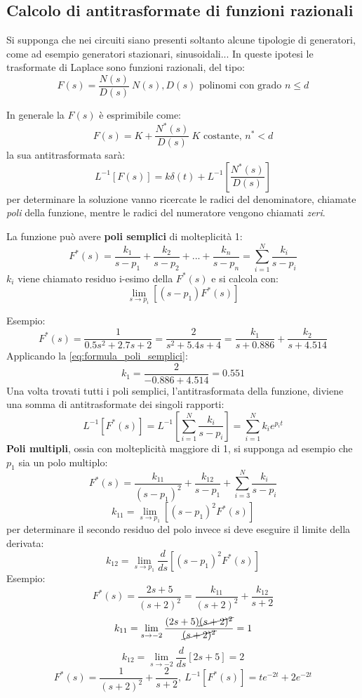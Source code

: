 
\subsection{Calcolo di antitrasformate di funzioni razionali}
Si supponga che nei circuiti siano presenti soltanto alcune tipologie di generatori, come ad esempio
generatori stazionari, sinusoidali... In queste ipotesi le trasformate di Laplace sono funzioni 
razionali, del tipo:
$$
F(s) = \frac{N(s)}{D(s)}\ N(s),D(s) \text{ polinomi con grado } n\leq d
$$

In generale la $F(s)$ è esprimibile come:
$$
F(s) = K + \frac{N^*(s)}{D(s)}\ K \text{ costante, } n^* < d
$$
la sua antitrasformata sarà:
$$
L^{-1}[F(s)] = k\delta(t) + L^{-1}\left[\frac{N^*(s)}{D(s)}\right] 
$$
per determinare la soluzione vanno ricercate le radici del denominatore, chiamate \textit{poli}
della funzione, mentre le radici del numeratore vengono chiamati \textit{zeri}.

La funzione può avere \textbf{poli semplici} di molteplicità 1:
$$
F^*(s) = \frac{k_1}{s-p_1} + \frac{k_2}{s-p_2} + ... + \frac{k_n}{s-p_n} = \sum_{i=1}^{N}\frac{k_i}{s-p_i}
$$
$k_i$ viene chiamato residuo i-esimo della $F^*(s)$ e si calcola con:
\begin{equation}
\lim_{s\to p_i} \left[(s-p_1)F^*(s)\right]
\label{eq:formula_poli_semplici}
\end{equation}

Esempio:
$$
F^*(s) = \frac{1}{0.5s^2+2.7s+2} = \frac{2}{s^2+5.4s+4} = \frac{k_1}{s+0.886} + \frac{k_2}{s+4.514}
$$
Applicando la \ref{eq:formula_poli_semplici}:
$$
k_1 = \frac{2}{-0.886+4.514} = 0.551
$$
Una volta trovati tutti i poli semplici, l'antitrasformata della funzione, diviene una somma di
antitrasformate dei singoli rapporti:
$$
L^{-1}[F^*(s)] = L^{-1}\left[\sum_{i=1}^{N}\frac{k_i}{s-p_i}\right] = \sum_{i=1}^{N} k_ie^{p_i t}
$$
\textbf{Poli multipli}, ossia con molteplicità maggiore di 1, si supponga ad esempio che $p_1$ sia un polo multiplo:
$$
F^*(s) = \frac{k_{11}}{(s-p_1)^2} + \frac{k_{12}}{s-p_1} + \sum_{i=3}^{N} \frac{k_i}{s-p_i}
$$
$$
k_{11} = \lim_{s\to p_1} \left[(s-p_1)^2F^*(s)\right]
$$
per determinare il secondo residuo del polo invece si deve eseguire il limite della derivata:
$$
k_{12} = \lim_{s\to p_1} \frac{d}{ds} \left[(s-p_1)^2 F^*(s)\right]
$$
Esempio:
$$
F^*(s) = \frac{2s+5}{(s+2)^2} = \frac{k_{11}}{(s+2)^2} + \frac{k_{12}}{s+2}
$$
$$
k_{11} = \lim_{s\to-2} \frac{(2s+5)\cancel{(s+2)^2}}{\cancel{(s+2)^2}} = 1
$$
$$
k_{12} = \lim_{s \to -2} \frac{d}{ds} [2s+5] = 2
$$
$$
F^*(s) = \frac{1}{(s+2)^2}+\frac{2}{s+2},\ L^{-1}[F^*(s)] = te^{-2t}+2e^{-2t}
$$

